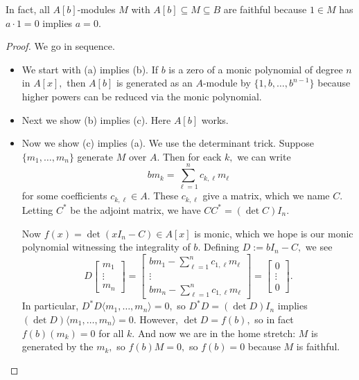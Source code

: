 \begin{remark}
    In fact, all $A[b]$-modules $M$ with $A[b]\subseteq M\subseteq B$ are faithful because $1\in M$ has $a\cdot1=0$ implies $a=0.$
\end{remark}
\begin{proof}
    We go in sequence.
    \begin{itemize}
        \item We start with (a) implies (b). If $b$ is a zero of a monic polynomial of degree $n$ in $A[x],$ then $A[b]$ is generated as an $A$-module by $\{1,b,\ldots,b^{n-1}\}$ because higher powers can be reduced via the monic polynomial.
        
        \item Next we show (b) implies (c). Here $A[b]$ works.
        
        \item Now we show (c) implies (a). We use the determinant trick. Suppose $\{m_1,\ldots,m_n\}$ generate $M$ over $A.$ Then for eack $k,$ we can write
        \[bm_k=\sum_{\ell=1}^nc_{k,\ell}m_\ell\]
        for some coefficients $c_{k,\ell}\in A.$ These $c_{k,\ell}$ give a matrix, which we name $C.$ Letting $C^*$ be the adjoint matrix, we have $CC^*=(\det C)I_n.$
        
        Now $f(x)=\det(xI_n-C)\in A[x]$ is monic, which we hope is our monic polynomial witnessing the integrality of $b.$ Defining $D:=bI_n-C,$ we see
        \[D\begin{bmatrix}
            m_1 \\
            \vdots \\
            m_n
        \end{bmatrix}=\begin{bmatrix}
            bm_1-\sum_{\ell=1}^nc_{1,\ell}m_\ell \\
            \vdots \\
            bm_n-\sum_{\ell=1}^nc_{1,\ell}m_\ell
        \end{bmatrix}=\begin{bmatrix}
            0 \\
            \vdots \\
            0
        \end{bmatrix}.\]
        In particular, $D^*D\langle m_1,\ldots,m_n\rangle=0,$ so $D^*D=(\det D)I_n$ implies $(\det D)\langle m_1,\ldots,m_n\rangle=0.$ However, $\det D=f(b),$ so in fact $f(b)(m_k)=0$ for all $k.$ And now we are in the home stretch: $M$ is generated by the $m_k,$ so $f(b)M=0,$ so $f(b)=0$ because $M$ is faithful.
        \qedhere
    \end{itemize}
\end{proof}